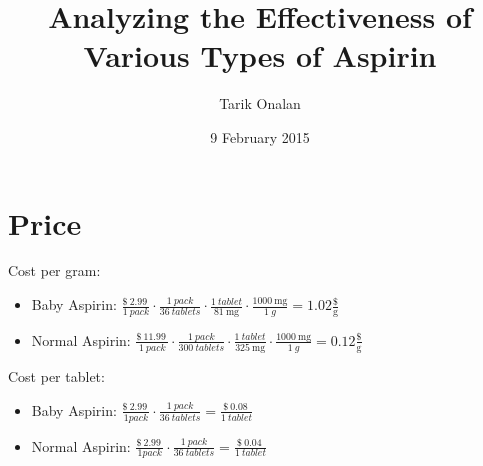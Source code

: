 \documentclass[a4paper]{article}
\title{Analyzing the Effectiveness of Various Types of Aspirin}
\date{9 February 2015}
\author{Tarik Onalan}
\begin{document}
    \maketitle
    \section{Price}
        Cost per gram:
        \begin{itemize}
            \item Baby Aspirin: $\frac{\SI{2.99}[\$]{}}{1~pack}\cdot\frac{1~pack}{36~tablets}\cdot\frac{1~tablet}{\SI{81}{\mg}}\cdot\frac{\SI{1000}{\mg}}{\SI{1}{g}}=1.02\frac{\$}{\si{\g}}$
            \item Normal Aspirin: $\frac{\SI{11.99}[\$]{}}{1~pack}\cdot\frac{1~pack}{300~tablets}\cdot\frac{1~tablet}{\SI{325}{\mg}}\cdot\frac{\SI{1000}{\mg}}{\SI{1}{g}}=0.12\frac{\$}{\si{\g}}$
        \end{itemize}
        Cost per tablet:
        \begin{itemize}
            \item Baby Aspirin: $\frac{\SI{2.99}[\$]{}}{1 pack}\cdot\frac{1~pack}{36~tablets}=\frac{\SI{0.08}[\$]{}}{1~tablet}$
            \item Normal Aspirin: $\frac{\SI{2.99}[\$]{}}{1 pack}\cdot\frac{1~pack}{36~tablets}=\frac{\SI{0.04}[\$]{}}{1~tablet}$
        \end{itemize}
\end{document}
